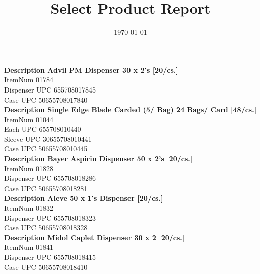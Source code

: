 \documentclass{article}
\title{Select Product Report}
\date{\today}
\begin{document}
\maketitle

{\bfseries Description		Advil PM Dispenser 30 x 2's [20/cs.]                         }\\
ItemNum\hspace{2cm}   01784  \\
Dispenser UPC\hspace{2cm}    655708017845  \\
Case UPC\hspace{2cm}    50655708017840  \\


{\bfseries Description		Single Edge Blade Carded (5/ Bag) 24 Bags/ Card [48/cs.]     }\\
ItemNum\hspace{2cm}           01044  \\
Each UPC  \hspace{2cm}    655708010440  \\
Sleeve UPC\hspace{2cm}    30655708010441  \\
Case UPC\hspace{2cm}    50655708010445  \\


{\bfseries Description		Bayer Aspirin Dispenser 50 x 2's [20/cs.]                    }\\
ItemNum\hspace{2cm}   01828  \\
Dispenser UPC\hspace{2cm}    655708018286  \\
Case UPC\hspace{2cm}    50655708018281  \\


{\bfseries Description		Aleve 50 x 1's Dispenser [20/cs.]                            }\\
ItemNum\hspace{2cm}   01832  \\
Dispenser UPC\hspace{2cm}    655708018323  \\
Case UPC\hspace{2cm}    50655708018328  \\


{\bfseries Description		Midol Caplet Dispenser 30 x 2 [20/cs.]                       }\\
ItemNum\hspace{2cm}   01841  \\
Dispenser UPC\hspace{2cm}    655708018415  \\
Case UPC\hspace{2cm}    50655708018410  \\
\end{document}
